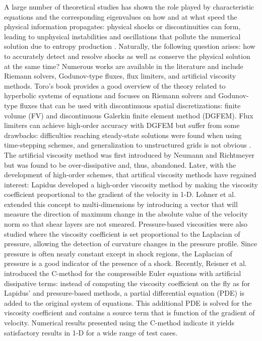 A large number of theoretical studies has shown the role played by characteristic equations and the corresponding eigenvalues on how and at what speed the physical information propagates: physical shocks or discontinuities can form, leading to unphysical instabilities and oscillations that pollute the numerical solution due to entropy production \cite{Toro}. Naturally, the following question arises: how to accurately detect and resolve shocks as well as conserve the physical solution at the same time? Numerous works are available in the literature and include Riemann solvers, Godunov-type fluxes, flux limiters, and artificial viscosity methods. Toro's book \cite{Toro} provides a good overview of the theory related to hyperbolic systems of equations and focuses on Riemann solvers and Godunov-type fluxes that can be used with discontinuous spatial discretizations: finite volume (FV) and discontinuous Galerkin finite element method (DGFEM).
Flux limiters \cite{FluxLimiter1, FluxLimiter3} can achieve high-order accuracy with DGFEM \cite{FluxLimiter2} but suffer from some drawbacks: difficulties reaching steady-state solutions were found when using time-stepping schemes, and generalization to unstructured grids is not obvious \cite{FluxLimiter4}. The artificial viscosity method was first introduced by Neumann and Richtmeyer \cite{Neumann} but was found to be over-dissipative and, thus, abandoned. Later, with the development of high-order schemes, that artifical viscosity methods have regained interest: Lapidus \cite{Lapidus_paper, Lapidus_book} developed a high-order viscosity method by making the viscosity coefficient proportional to the gradient of the velocity in 1-D. Lohner et al. \cite{LMP} extended this concept to multi-dimensions by introducing a vector that will measure the direction of maximum change in the absolute value of the velocity norm so that shear layers are not smeared. Pressure-based viscosities were also studied \cite{PBV_book} where the viscosity coefficient is set proportional to the Laplacian of pressure, allowing the detection of curvature changes in the pressure profile. Since pressure is often nearly constant except in shock regions, the Laplacian of pressure is a good indicator of the presence of a shock.
Recently, Reisner et al. \cite{Reisner} introduced the C-method for the compressible Euler equations with artificial dissipative terms: instead of computing the viscosity coefficient on the fly as for Lapidus' and pressure-based methods, a partial differential equation (PDE) is added to the original system of equations. This additional PDE is solved for the viscosity coefficient and contains a source term that is function of the gradient of velocity. Numerical results presented using the C-method indicate it yields satisfactory results in 1-D for a wide range of test cases. 
